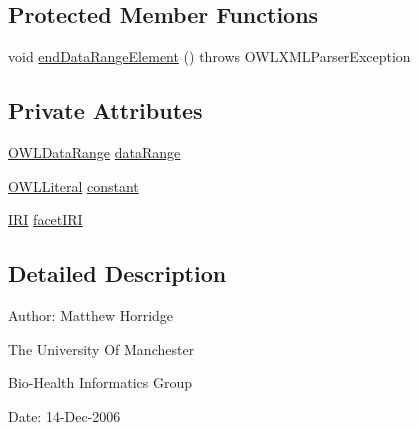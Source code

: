 \subsection*{Protected Member Functions}
\begin{DoxyCompactItemize}
\item 
void \hyperlink{classorg_1_1coode_1_1owlapi_1_1owlxmlparser_1_1_o_w_l_data_restriction_element_handler_ae66d5ef85fa8d5b83239da40154b5e10}{end\-Data\-Range\-Element} ()  throws O\-W\-L\-X\-M\-L\-Parser\-Exception 
\end{DoxyCompactItemize}
\subsection*{Private Attributes}
\begin{DoxyCompactItemize}
\item 
\hyperlink{interfaceorg_1_1semanticweb_1_1owlapi_1_1model_1_1_o_w_l_data_range}{O\-W\-L\-Data\-Range} \hyperlink{classorg_1_1coode_1_1owlapi_1_1owlxmlparser_1_1_o_w_l_data_restriction_element_handler_aaed277b61e243f2d32218cb2d1504303}{data\-Range}
\item 
\hyperlink{interfaceorg_1_1semanticweb_1_1owlapi_1_1model_1_1_o_w_l_literal}{O\-W\-L\-Literal} \hyperlink{classorg_1_1coode_1_1owlapi_1_1owlxmlparser_1_1_o_w_l_data_restriction_element_handler_aba11b708fb16836ed2dfe7f345a00828}{constant}
\item 
\hyperlink{classorg_1_1semanticweb_1_1owlapi_1_1model_1_1_i_r_i}{I\-R\-I} \hyperlink{classorg_1_1coode_1_1owlapi_1_1owlxmlparser_1_1_o_w_l_data_restriction_element_handler_a2d1d189427b02dececeb599dd1c0c25c}{facet\-I\-R\-I}
\end{DoxyCompactItemize}


\subsection{Detailed Description}
Author\-: Matthew Horridge\par
 The University Of Manchester\par
 Bio-\/\-Health Informatics Group\par
 Date\-: 14-\/\-Dec-\/2006\par
\par
 


